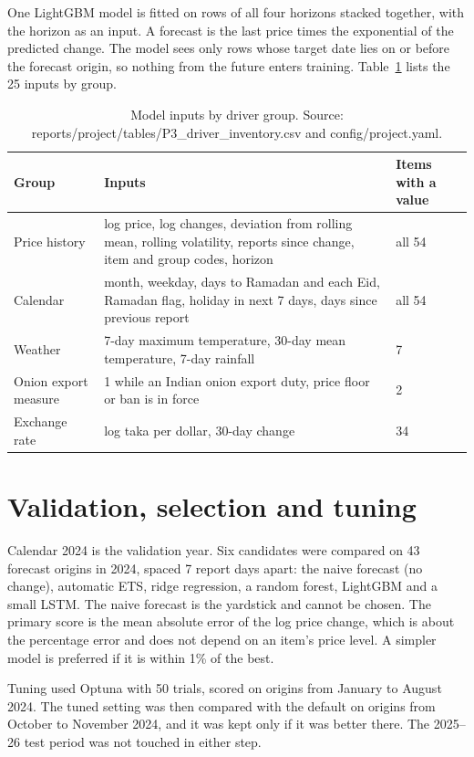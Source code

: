 \documentclass[12pt]{report}
\begin{document}
One LightGBM model is fitted on rows of all four horizons stacked together, with the horizon as an input. A forecast is the last price times the exponential of the predicted change. The model sees only rows whose target date lies on or before the forecast origin, so nothing from the future enters training. Table~\ref{tab:features} lists the 25 inputs by group.

\begin{table}[H]\centering\small
\caption{Model inputs by driver group. Source: reports/project/tables/P3\_driver\_inventory.csv and config/project.yaml.}\label{tab:features}
\begin{tabular}{p{3.2cm}p{7.8cm}p{2.4cm}}
\toprule
Group & Inputs & Items with a value \\
\midrule
Price history & log price, log changes, deviation from rolling mean, rolling volatility, reports since change, item and group codes, horizon & all 54 \\
Calendar & month, weekday, days to Ramadan and each Eid, Ramadan flag, holiday in next 7 days, days since previous report & all 54 \\
Weather & 7-day maximum temperature, 30-day mean temperature, 7-day rainfall & 7 \\
Onion export measure & 1 while an Indian onion export duty, price floor or ban is in force & 2 \\
Exchange rate & log taka per dollar, 30-day change & 34 \\
\bottomrule
\end{tabular}
\end{table}

\section{Validation, selection and tuning}
Calendar 2024 is the validation year. Six candidates were compared on 43 forecast origins in 2024, spaced 7 report days apart: the naive forecast (no change), automatic ETS, ridge regression, a random forest, LightGBM and a small LSTM. The naive forecast is the yardstick and cannot be chosen. The primary score is the mean absolute error of the log price change, which is about the percentage error and does not depend on an item's price level. A simpler model is preferred if it is within 1\% of the best.

Tuning used Optuna with 50 trials, scored on origins from January to August 2024. The tuned setting was then compared with the default on origins from October to November 2024, and it was kept only if it was better there. The 2025--26 test period was not touched in either step.
\end{document}
